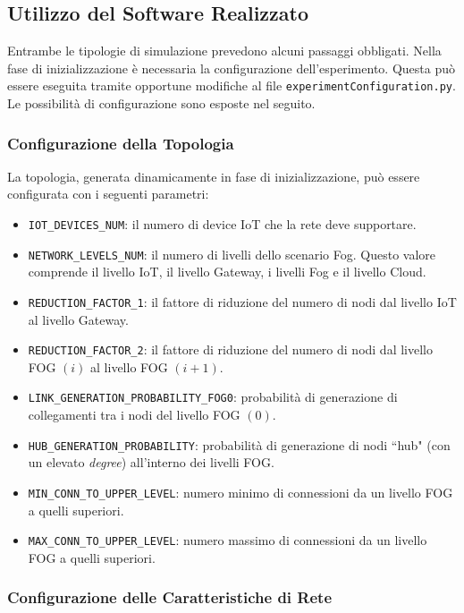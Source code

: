 \subsection{Utilizzo del Software Realizzato}

Entrambe le tipologie di simulazione prevedono alcuni passaggi obbligati. Nella fase di inizializzazione è necessaria la configurazione dell'esperimento. Questa può essere eseguita tramite opportune modifiche al file \texttt{\justify experimentConfiguration.py}. Le possibilità di configurazione sono esposte nel seguito.

\subsubsection{Configurazione della Topologia}

La topologia, generata dinamicamente in fase di inizializzazione, può essere configurata con i seguenti parametri:
\begin{itemize}
	\item \texttt{IOT\_DEVICES\_NUM}: il numero di device IoT che la rete deve supportare.
	\item \texttt{NETWORK\_LEVELS\_NUM}: il numero di livelli dello scenario Fog. Questo valore comprende il livello IoT, il livello Gateway, i livelli Fog e il livello Cloud.
	\item \texttt{REDUCTION\_FACTOR\_1}: il fattore di riduzione del numero di nodi dal livello IoT al livello Gateway.
	\item \texttt{REDUCTION\_FACTOR\_2}: il fattore di riduzione del numero di nodi dal livello FOG $(i)$ al livello FOG $(i+1)$.
	\item \texttt{LINK\_GENERATION\_PROBABILITY\_FOG0}: probabilità di generazione di collegamenti tra i nodi del livello FOG $(0)$.
	\item \texttt{HUB\_GENERATION\_PROBABILITY}: probabilità di generazione di nodi ``hub" (con un elevato \textit{degree}) all'interno dei livelli FOG. 
	\item \texttt{MIN\_CONN\_TO\_UPPER\_LEVEL}: numero minimo di connessioni da un livello FOG a quelli superiori.
	\item \texttt{MAX\_CONN\_TO\_UPPER\_LEVEL}: numero massimo di connessioni da un livello FOG a quelli superiori.
\end{itemize}

\subsubsection{Configurazione delle Caratteristiche di Rete}

